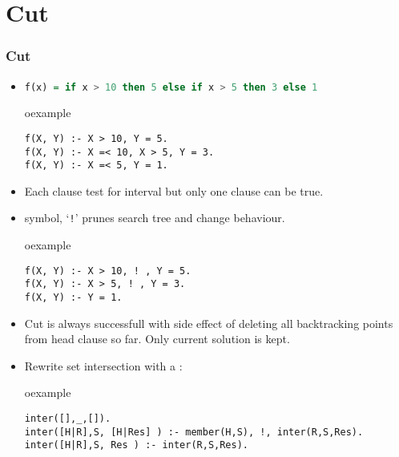 \section{Cut}
\begin{frame}[fragile]
\scriptsize
\frametitle{Cut}
\begin{itemize}[<+->]
\item \lstinline[language=Haskell]!f(x) = if x > 10 then 5 else if x > 5 then 3 else 1!\\
\begin{beamercolorbox}{oexample}
\begin{lstlisting}[escapeinside=`']
f(X, Y) :- X > 10, Y = 5.
f(X, Y) :- X =< 10, X > 5, Y = 3.
f(X, Y) :- X =< 5, Y = 1.
\end{lstlisting}
\end{beamercolorbox}
\item Each clause test for interval but only one clause can be true.
\item {} symbol, `\lstinline{!}' prunes search tree and change behaviour.\\
\begin{beamercolorbox}{oexample}
\begin{lstlisting}[escapeinside=`']
f(X, Y) :- X > 10, ! , Y = 5.
f(X, Y) :- X > 5, ! , Y = 3.
f(X, Y) :- Y = 1.
\end{lstlisting}
\end{beamercolorbox}
\item Cut is always successfull with side effect of deleting all backtracking points from
head clause so far. Only current solution is kept.
\item Rewrite set intersection with a :\\
\begin{beamercolorbox}{oexample}
\begin{lstlisting}[escapeinside=`']
inter([],_,[]).
inter([H|R],S, [H|Res] ) :- member(H,S), !, inter(R,S,Res).
inter([H|R],S, Res ) :- inter(R,S,Res).
\end{lstlisting}
\end{beamercolorbox}
\end{itemize}
\end{frame}

